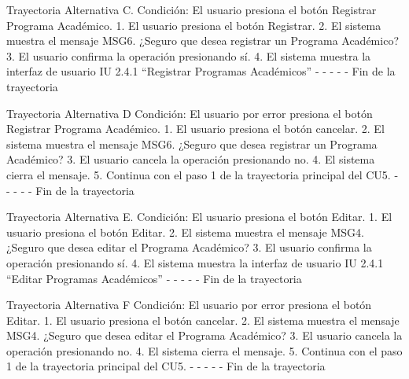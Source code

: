 Trayectoria Alternativa C.
Condición: El usuario presiona el botón Registrar Programa Académico.
1.	El usuario presiona el botón Registrar.
2.	El sistema muestra el mensaje MSG6. ¿Seguro que desea registrar un Programa Académico?
3.	El usuario confirma la operación presionando sí.
4.	El sistema muestra la interfaz de usuario IU 2.4.1 “Registrar Programas Académicos”
-	- - - - Fin de la trayectoria

Trayectoria Alternativa D
Condición: El usuario por error presiona el botón  Registrar Programa Académico.
1.	El usuario presiona el botón cancelar.
2.	El sistema muestra el mensaje MSG6. ¿Seguro que desea registrar un Programa Académico?
3.	El usuario cancela la operación presionando no.
4.	El sistema cierra el mensaje.
5.	Continua con el paso 1 de la trayectoria principal del CU5.
-	- - - - Fin de la trayectoria

Trayectoria Alternativa E.
Condición: El usuario presiona el botón Editar.
1.	El usuario presiona el botón Editar.
2.	El sistema muestra el mensaje MSG4. ¿Seguro que desea editar el Programa Académico?
3.	El usuario confirma la operación presionando sí.
4.	El sistema muestra la interfaz de usuario IU 2.4.1 “Editar Programas Académicos”
-	- - - - Fin de la trayectoria

Trayectoria Alternativa F
Condición: El usuario por error presiona el botón Editar.
1.	El usuario presiona el botón cancelar.
2.	El sistema muestra el mensaje MSG4. ¿Seguro que desea editar el Programa Académico?
3.	El usuario cancela la operación presionando no.
4.	El sistema cierra el mensaje.
5.	Continua con el paso 1 de la trayectoria principal del CU5.
-	- - - - Fin de la trayectoria




